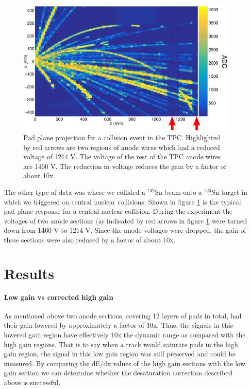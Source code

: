 \documentclass[review]{elsarticle}
\begin{document}
\begin{figure}[H]
\includegraphics[width=\linewidth]{data.pdf}
\caption{Pad plane projection for a collision event in the TPC. Highlighted by red arrows are two regions of anode wires which had a reduced voltage of 1214 V. The voltage of the rest of the TPC anode wires are 1460 V. The reduction in voltage reduces the gain by a factor of about 10x. }
\label{fig:data}
\end{figure}

The other type of data was where we collided a ${}^{132}$Sn beam onto a ${}^{124}$Sn target in which we triggered on central nuclear collisions. Shown in figure \ref{fig:data} is the typical pad plane response for a central nuclear collision. During the experiment the voltages of two anode sections (as indicated by red arrows in figure \ref{fig:data} were turned down from 1460 V to 1214 V. Since the anode voltages were dropped, the gain of these sections were also reduced by a factor of about 10x. 


\section{Results}
\paragraph{Low gain vs corrected high gain}

As mentioned above two anode sections, covering 12 layers of pads in total, had their gain lowered by approximately a factor of 10x. Thus, the signals in this lowered gain region have effectively 10x the dynamic range as compared with the high gain regions. That is to say when a track would saturate pads in the high gain region, the signal in this low gain region was still preserved and could be measured. By comparing the dE/dx values of the high gain sections with the low gain section we can determine whether the desaturation correction described above is successful. 
\end{document}
